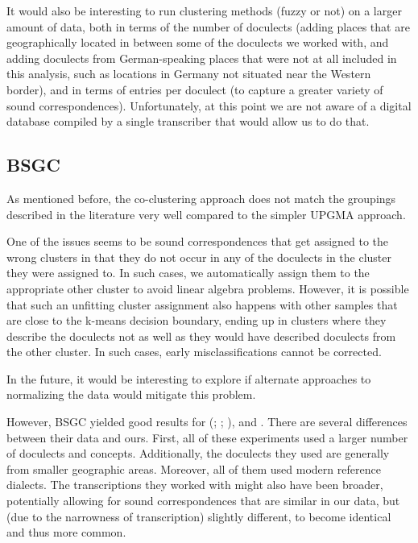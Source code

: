 \documentclass[a4paper]{article}
\begin{document}
It would also be interesting to run clustering
methods (fuzzy or not) on a larger amount of data,
both in terms of the number of doculects
(adding places that are geographically located
in between some of the doculects we worked with,
and adding doculects from German-speaking places that
were not at all included in this analysis, such as
locations in Germany not situated near the Western border),
and in terms of entries per doculect
(to capture a greater variety of sound correspondences).
Unfortunately, at this point we are not aware of
a digital database compiled by a single transcriber that
would allow us to do that.


\subsection{BSGC}

As mentioned before, the co-clustering approach
does not match the groupings described in the literature very well
compared to the simpler UPGMA approach.

One of the issues seems to be
sound correspondences that get assigned to the wrong clusters
in that they do not occur in any of the doculects in the cluster
they were assigned to.
In such cases, we automatically assign them to the appropriate
other cluster to avoid linear algebra problems.
However, it is possible that such an unfitting
cluster assignment also happens with other samples
that are close to the k-means decision boundary,
ending up in clusters where they describe the doculects
not as well as they would have described doculects from the other cluster.
In such cases, early misclassifications cannot be corrected.

In the future, it would be interesting to
explore if alternate approaches to normalizing the data
would mitigate this problem.

However, BSGC yielded good results for \citeauthor{wieling2011bipartite}
(\citeyear{wieling2009bipartite}; \citeyear{wieling2010hierarchical}; \citeyear{wieling2011bipartite}),
\citet{wieling2013analyzing} and \citet{montemagni2013synchronic}.
There are several differences between their data and ours.
First, all of these experiments used a larger number
of doculects and concepts.
Additionally, the doculects they used are
generally from smaller geographic areas.
Moreover, all of them used modern reference dialects.
The transcriptions they worked with might also have been broader,
potentially allowing for sound correspondences that are similar in our data,
but (due to the narrowness of transcription) slightly different,
to become identical and thus more common.
\end{document}
